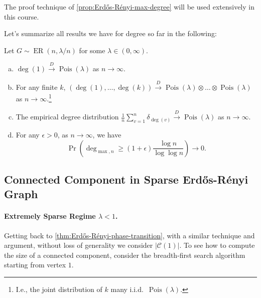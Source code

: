 \begin{remark}
	The proof technique of \autoref{prop:Erdős-Rényi-max-degree} will be used extensively in this course.
\end{remark}

Let's summarize all results we have for degree so far in the following:

\begin{theorem}\label{thm:degree-of-sparse-Erdős-Rényi-graph}
	Let \(G \sim \operatorname{ER}(n, \lambda / n) \) for some \(\lambda \in (0, \infty )\).
	\begin{enumerate}[(a)]
		\item\label{thm:degree-of-sparse-Erdős-Rényi-graph-a} \(\deg (1) \overset{D}{\to} \operatorname{Pois}(\lambda ) \) as \(n\to \infty \).
		\item\label{thm:degree-of-sparse-Erdős-Rényi-graph-b} For any finite \(k\), \((\deg (1), \dots , \deg (k)) \overset{D}{\to} \operatorname{Pois}(\lambda ) \otimes \dots \otimes \operatorname{Pois}(\lambda ) \) as \(n\to \infty \).\footnote{I.e., the joint distribution of \(k\) many i.i.d.\ \(\operatorname{Pois}(\lambda ) \).}
		\item\label{thm:degree-of-sparse-Erdős-Rényi-graph-c} The empirical degree distribution \(\frac{1}{n} \sum_{v=1}^{n} \delta _{\deg (v)} \overset{D}{\to} \operatorname{Pois}(\lambda ) \) as \(n\to \infty \).
		\item\label{thm:degree-of-sparse-Erdős-Rényi-graph-d} For any \(\epsilon > 0\), as \(n \to \infty \), we have
		      \[
			      \Pr_{}\left( \deg _{\max , n} \geq (1 + \epsilon ) \frac{\log n}{\log \log n} \right)
			      \to 0.
		      \]
	\end{enumerate}
\end{theorem}

\subsection{Connected Component in Sparse Erdős-Rényi Graph}
\paragraph{Extremely Sparse Regime \(\lambda < 1\).}
Getting back to \autoref{thm:Erdős-Rényi-phase-transition}, with a similar technique and argument, without loss of generality we consider \(\lvert \mathcal{C} (1) \rvert \). To see how to compute the size of a connected component, consider the breadth-first search algorithm starting from vertex \(1\).

